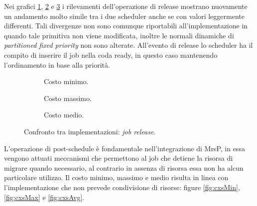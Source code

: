 \noindent Nei grafici \ref{fig:releaseMin}, \ref{fig:releaseMax} e \ref{fig:releaseAvg} i rilevamenti dell'operazione di release mostrano nuovamente un andamento molto simile tra i due scheduler anche se con valori leggermente differenti. Tali divergenze non sono comunque riportabili all'implementazione in quando tale primitiva non viene modificata, inoltre le normali dinamiche di \textit{partitioned fixed priority} non sono alterate. All'evento di release lo scheduler ha il compito di inserire il job nella coda ready, in questo caso mantenendo l'ordinamento in base alla priorità.\\

  \begin{figure}[htb]
    \centering
      \begin{subfigure}[b]{0.49\textwidth}
        \centering
        \resizebox{\linewidth}{!}\graficoReleaseMIN  
        \caption{Costo minimo.}
        \label{fig:releaseMin}
      \end{subfigure}
      \begin{subfigure}[b]{0.49\textwidth}
        \centering
        \resizebox{\linewidth}{!}\graficoReleaseMAX
        \caption{Costo massimo.}
        \label{fig:releaseMax}
      \end{subfigure}
      \begin{subfigure}[b]{0.49\textwidth}
        \centering
        \resizebox{\linewidth}{!}\graficoReleaseAVG
        \caption{Costo medio.}
        \label{fig:releaseAvg}
      \end{subfigure}

    \caption{Confronto tra implementazioni: \textit{job release}.}
    \label{fig:release}
  \end{figure}
        
\noindent L'operazione di post-schedule è fondamentale nell'integrazione di MrsP, in essa vengono attuati meccanismi che permettono al job che detiene la risorsa di migrare quando necessario, al contrario in assenza di risorsa essa non ha alcun particolare utilizzo. Il costo minimo, massimo e medio risulta in linea con l'implementazione che non prevede condivisione di risorse: figure \ref{fig:cxsMin}, \ref{fig:cxsMax} e \ref{fig:cxsAvg}.\\


